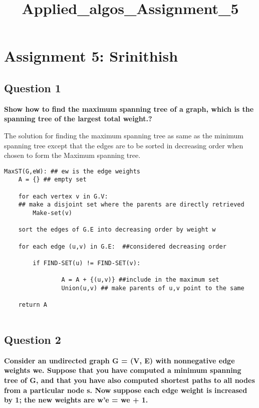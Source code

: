 \documentclass[11pt]{article}
\title{Applied\_algos\_Assignment\_5}
\begin{document}
    
    
    \maketitle
    
    

    
    \section{Assignment 5: Srinithish}\label{assignment-5-srinithish}

    \subsection{Question 1}\label{question-1}

\textbf{Show how to find the maximum spanning tree of a graph, which is
the spanning tree of the largest total weight.?}

The solution for finding the maximum spanning tree as same as the
minimum spanning tree except that the edges are to be sorted in
decreasing order when chosen to form the Maximum spanning tree.

    \begin{verbatim}
MaxST(G,eW): ## ew is the edge weights
    A = {} ## empty set
    
    for each vertex v in G.V:
    ## make a disjoint set where the parents are directly retrieved    
        Make-set(v) 
    
    sort the edges of G.E into decreasing order by weight w
    
    for each edge (u,v) in G.E:  ##considered decreasing order
    
        if FIND-SET(u) != FIND-SET(v):
    
                A = A + {(u,v)} ##include in the maximum set
                Union(u,v) ## make parents of u,v point to the same
    
    return A
    
\end{verbatim}

    \subsection{Question 2}\label{question-2}

\textbf{Consider an undirected graph G = (V, E) with nonnegative edge
weights we. Suppose that you have computed a minimum spanning tree of G,
and that you have also computed shortest paths to all nodes from a
particular node s. Now suppose each edge weight is increased by 1; the
new weights are w'e = we + 1.}
\end{document}
